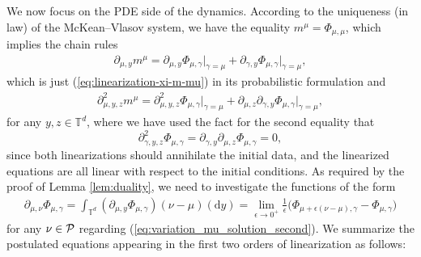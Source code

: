 We now focus on the PDE side of the dynamics. According to the uniqueness (in law) of the McKean–Vlasov system, we have the equality $m^{\mu} = \Phi_{\mu,\mu}$, which implies the chain rules 
\begin{equation}\label{eq:chain_rule_m_mu}
\begin{split}
 \partial_{\mu,y} m^{\mu}  = \partial_{\mu,y} \Phi_{\mu,\gamma}\Big|_{\gamma = \mu} +\partial_{\gamma,y} \Phi_{\mu,\gamma}\Big|_{\gamma = \mu},
  \end{split}
\end{equation}
which is just (\ref{eq:linearization-xi-m-mu}) in its probabilistic formulation and \begin{equation}\label{eq:chain_rule_m_mu_2}
\begin{split}
\partial_{\mu,y,z}^2 m^{\mu}  = \partial_{\mu,y,z}^2 \Phi_{\mu,\gamma}\Big|_{\gamma = \mu} +\partial_{\mu, z} \partial_{\gamma,y} \Phi_{\mu,\gamma}\Big|_{\gamma = \mu},
\end{split}
\end{equation}
for any $y,z \in \mathbb{T}^d$, where we have used the fact for the second equality that 
\[
\partial^2_{\gamma,y,z} \Phi_{\mu,\gamma} =  \partial_{\gamma,y} \partial_{\mu, z}\Phi_{\mu,\gamma} = 0, 
\]
since both linearizations should annihilate the initial data, and the linearized equations are all linear with respect to the initial conditions. As required by the proof of Lemma \ref{lem:duality}, we need to investigate the functions of the form 
\begin{align*}
\partial_{\mu,\nu} \Phi_{\mu,\gamma} = \int_{\mathbb{T}^{d}} (\partial_{\mu,y} \Phi_{\mu,\gamma}) (\nu - \mu)(\mathrm{d}y)= \lim_{\epsilon \to 0^+}  \frac{1}{\epsilon}\big(\Phi_{\mu + \epsilon(\nu - \mu),\gamma} - \Phi_{\mu,\gamma} \big) 
\end{align*}
for any $\nu \in \mathcal{P}$ regarding (\ref{eq:variation_mu_solution_second}). We summarize the postulated equations appearing in the first two orders of linearization as follows:
